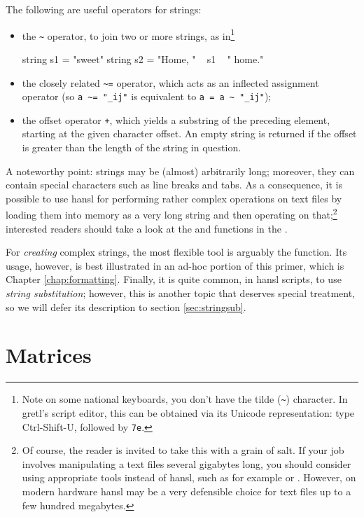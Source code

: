 The following are useful operators for strings:
\begin{itemize}
\item the \verb|~| operator, to join two or more strings, as
in\footnote{Note on some national keyboards, you don't have the tilde
  (\texttt{\~}) character. In gretl's script editor, this can be
  obtained via its Unicode representation: type Ctrl-Shift-U, followed
  by \texttt{7e}.}
  \begin{code}
    string s1 = "sweet"
    string s2 = "Home, " ~ s1 ~ " home."
  \end{code}
\item the closely related \verb|~=| operator, which acts as an
  inflected assignment operator (so \verb|a ~= "_ij"| is equivalent to
  \verb|a = a ~ "_ij"|);
\item the offset operator \texttt{+}, which yields a substring of the
  preceding element, starting at the given character offset.  An empty
  string is returned if the offset is greater than the length of the
  string in question.
\end{itemize}

A noteworthy point: strings may be (almost) arbitrarily long;
moreover, they can contain special characters such as line breaks and
tabs. As a consequence, it is possible to use hansl for performing
rather complex operations on text files by loading them into memory as
a very long string and then operating on that;\footnote{Of course, the
  reader is invited to take this with a grain of salt. If your job
  involves manipulating a text files several gigabytes long, you
  should consider using appropriate tools instead of hansl, such as
  for example  or . However, on modern hardware
  hansl may be a very defensible choice for text files up to a few
  hundred megabytes.} interested readers should take a look at the
 and  functions in the \GCR.

For \emph{creating} complex strings, the most flexible tool is
arguably the  function. Its usage, however, is best
illustrated in an ad-hoc portion of this primer, which is
Chapter \ref{chap:formatting}. Finally, it is quite common, in hansl
scripts, to use \emph{string substitution}; however, this is another
topic that deserves special treatment, so we will defer its
description to section \ref{sec:stringsub}.

\chapter{Matrices}

